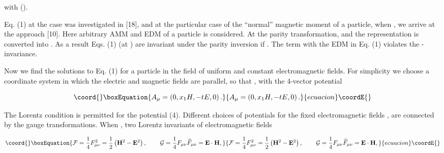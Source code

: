 \documentclass[a4paper,12pt]{article}
\begin{document}
with \coordHE{} (\coordHE{}).

Eq. (1) at the case \coordHE{} was investigated in [18], and at
the particular case of the ``normal'' magnetic moment of a
particle, when \coordHE{} , we arrive at the approach [10]. Here
arbitrary AMM and EDM of a particle is considered. At the parity
transformation, \myHighlight{$\varepsilon \rightarrow -\varepsilon ,$}\coordHE{} and the
representation \coordHE{} is converted into \coordHE{}. As a result Eqs.
(1) (at \coordHE{}) are invariant under the parity
inversion if \coordHE{}. The term with the EDM in Eq. (1)
violates the \coordHE{} - invariance.

Now we find the solutions to Eq. (1) for a particle in the field
of uniform and constant electromagnetic fields. For simplicity we
choose a coordinate system in which the electric \coordHE{} and
magnetic \coordHE{} fields are parallel, so that
\coordHE{}  \coordHE{}, \coordHE{} with the 4-vector potential

\begin{equation}\coord{}\boxEquation{
A_\mu =\left( 0,x_1H,-tE,0\right).  \label{4}
}{
A_\mu =\left( 0,x_1H,-tE,0\right).  }{ecuacion}\coordE{}\end{equation}

The Lorentz condition \coordHE{} is permitted for the
potential (4). Different choices of potentials for the fixed
electromagnetic fields \coordHE{}, \coordHE{} are connected
by the gauge transformations. When \coordHE{}, two Lorentz
invariants of electromagnetic fields

\begin{equation}\coord{}\boxEquation{
\mathcal{F}=\frac 14F_{\mu \nu }^2=\frac 12\left( \mathbf{H}^2-\mathbf{E}
^2\right) ,\hspace{0.3in}\mathcal{G}=\frac 14F_{\mu \nu }\widetilde{F}_{\mu
\nu }=\mathbf{E}\cdot \mathbf{H},  \label{5}
}{
\mathcal{F}=\frac 14F_{\mu \nu }^2=\frac 12\left( \mathbf{H}^2-\mathbf{E}
^2\right) ,\hspace{0.3in}\mathcal{G}=\frac 14F_{\mu \nu }\widetilde{F}_{\mu
\nu }=\mathbf{E}\cdot \mathbf{H},  }{ecuacion}\coordE{}\end{equation}
\end{document}
